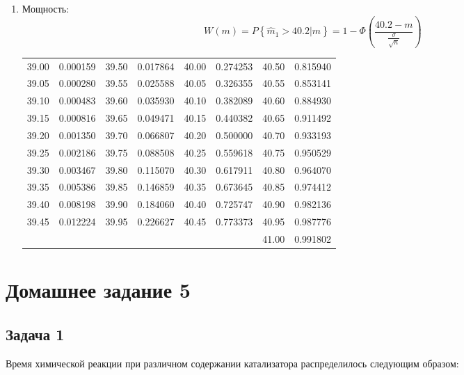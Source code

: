 \documentclass[a4paper,12pt]{article}
\newcommand{\probability}[1]{P \left\{ #1 \right\}}
\begin{document}
\begin{enumerate}
        \item Мощность:
              \[
                  W(m)
                  = \probability{\widehat{m}_1 > 40.2 | m}
                  = 1 - \Phi \left( \frac{40.2 - m}{\frac{\sigma}{\sqrt{n}}} \right)
              \]
              \begin{tabular}{|c|c|c|c|c|c|c|c|}
                  \hline
                  39.00 & 0.000159 & 39.50 & 0.017864 & 40.00 & 0.274253 & 40.50 & 0.815940 \\
                  39.05 & 0.000280 & 39.55 & 0.025588 & 40.05 & 0.326355 & 40.55 & 0.853141 \\
                  39.10 & 0.000483 & 39.60 & 0.035930 & 40.10 & 0.382089 & 40.60 & 0.884930 \\
                  39.15 & 0.000816 & 39.65 & 0.049471 & 40.15 & 0.440382 & 40.65 & 0.911492 \\
                  39.20 & 0.001350 & 39.70 & 0.066807 & 40.20 & 0.500000 & 40.70 & 0.933193 \\
                  39.25 & 0.002186 & 39.75 & 0.088508 & 40.25 & 0.559618 & 40.75 & 0.950529 \\
                  39.30 & 0.003467 & 39.80 & 0.115070 & 40.30 & 0.617911 & 40.80 & 0.964070 \\
                  39.35 & 0.005386 & 39.85 & 0.146859 & 40.35 & 0.673645 & 40.85 & 0.974412 \\
                  39.40 & 0.008198 & 39.90 & 0.184060 & 40.40 & 0.725747 & 40.90 & 0.982136 \\
                  39.45 & 0.012224 & 39.95 & 0.226627 & 40.45 & 0.773373 & 40.95 & 0.987776 \\
                  \hline
                        &          &       &          &       &          & 41.00 & 0.991802 \\
                  \hline
              \end{tabular}
    \end{enumerate}
\fi

\section*{Домашнее задание 5}

\subsection*{Задача 1 \cite[278]{Efimov}}

Время химической реакции при различном содержании катализатора распределилось следующим образом:
\end{document}
